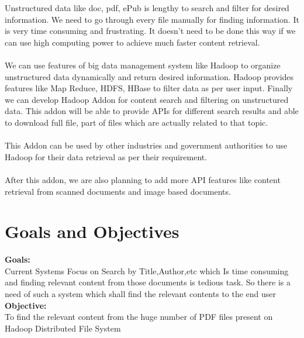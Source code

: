 \documentclass[oneside,a4paper,12pt]{report}
\begin{document}
Unstructured data like doc, pdf, ePub is lengthy to search and filter for desired information. We need to go through every file manually for finding information. It is very time consuming and frustrating. It doesn’t need to be done this way if we can use high computing power to achieve much faster content retrieval.\\\\
We can use features of big data management system like Hadoop to organize unstructured data dynamically and return desired information. Hadoop provides features like Map Reduce, HDFS, HBase to filter data as per user input. Finally we can develop Hadoop Addon for content search and filtering on unstructured data. This addon will be able to provide APIs for different search results and able to download full file, part of files which are actually related to that topic.\\\\
This Addon can be used by other industries and government authorities to use Hadoop for their data retrieval as per their requirement.\\\\
After this addon, we are also planning to add more API features like content retrieval from scanned documents and image based documents.

\section{Goals and Objectives}
\textbf{Goals:} \\
Current Systems Focus on Search by Title,Author,etc which Is time consuming and finding relevant content from those documents is tedious task. So there is a need of such a system which shall find the relevant contents to the end user \\

\noindent \textbf{Objective:} \\
To find the relevant content from the huge number of PDF files present on Hadoop Distributed File System \\

	
\end{document}
